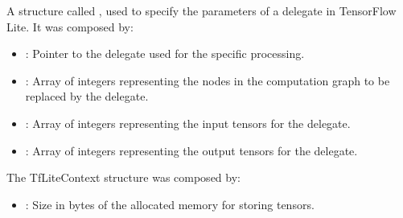 \begin{center}
    \label{Figure:Comatibily}
\end{center}

A structure called , used to specify the parameters of a delegate in TensorFlow Lite. It was composed by:

\begin{itemize}
    \item {}: Pointer to the delegate used for the specific processing.
    \item {}: Array of integers representing the nodes in the computation graph to be replaced by the delegate.
    \item {} : Array of integers representing the input tensors for the delegate.
    \item {}: Array of integers representing the output tensors for the delegate.
\end{itemize}



\begin{center}
    \label{Figure:Comatibily}
\end{center}

The TfLiteContext structure was composed by:

\begin{itemize}
    \item {}: Size in bytes of the allocated memory for storing tensors.
\end{itemize}

\begin{center}
    \label{Figure:Comatibily}
\end{center}

